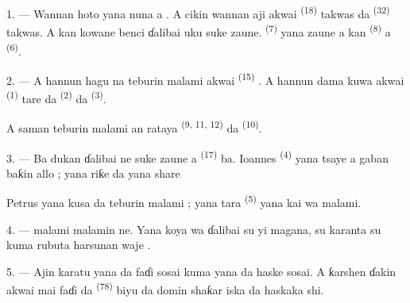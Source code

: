 \VUsaut{2.0mm}
\VUsaut{3.2mm}
\VUsaut{2.6mm}
\VUsaut{3.4mm}
\VUornamento{9pt}
\VUsaut{5.0mm}
\VUsaut{3.0mm}
\VUfilet{16mm}
\VUsaut{5.6mm}

\VUsaut{1.4mm}
\VUsaut{2.2mm}
\VUfilet{20mm}
\VUsaut{6.4mm}

\VUsaut{3.0mm}

1. --- Wannan hoto yana nuna  a
. A cikin wannan aji akwai
 \textsuperscript{(18)} takwas da 
\textsuperscript{(32)} takwas. A kan kowane benci ɗalibai uku suke
zaune.  \textsuperscript{(7)} yana zaune a kan
 \textsuperscript{(8)} a 
\textsuperscript{(6)}.

2. --- A hannun hagu na teburin malami akwai 
\textsuperscript{(15)} . A hannun dama kuwa akwai
 \textsuperscript{(1)} tare da  \textsuperscript{(2)} da 
\textsuperscript{(3)}.

A saman teburin malami an rataya 
\textsuperscript{(9, 11, 12)} da 
\textsuperscript{(10)}.

3. --- Ba dukan ɗalibai ne suke zaune a 
\textsuperscript{(17)} ba. Ioannes \textsuperscript{(4)} yana tsaye a
gaban baƙin allo ; yana riƙe da  yana share

Petrus yana kusa da teburin malami ; yana tara 
\textsuperscript{(5)} yana kai wa malami.

4. ---  malami malamin  ne.
Yana koya wa ɗalibai su yi magana, su karanta su kuma rubuta harsunan
waje .

5. --- Ajin karatu yana da faɗi sosai kuma yana da haske sosai. A
ƙarshen ɗakin akwai  mai faɗi da 
\textsuperscript{(78)} biyu da  domin shaƙar
iska da haskaka shi.

